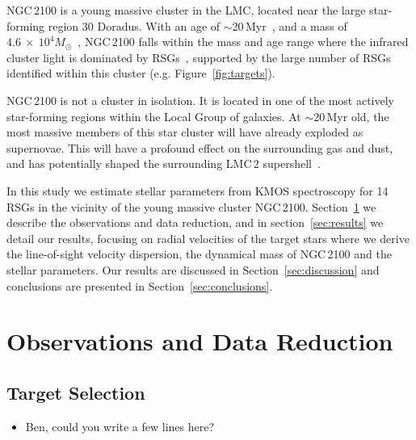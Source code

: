 \documentclass[useAMS,usenatbib]{mn2e}
\begin{document}

NGC\,2100 is a young massive cluster in the LMC, located near the large star-forming region 30 Doradus.
With an age of $\sim$20\,Myr~\citep{1991ApJS...76..185E,2015A&A...575A..62N}, and a mass of $4.6~\times~10^4M_{\odot}$~\citep[assuming~\cite{1966AJ.....71...64K} profiles]{2005ApJS..161..304M}, NGC\,2100 falls within the mass and age range where the infrared cluster light is dominated by RSGs~\citep{2013MNRAS.430L..35G},
supported by the large number of RSGs identified within this cluster (e.g. Figure~\ref{fig:targets}).

NGC\,2100 is not a cluster in isolation.
It is located in one of the most actively star-forming regions within the Local Group of galaxies.
At $\sim$20\,Myr old, the most massive members of this star cluster will have already exploded as supernovae.
This will have a profound effect on the surrounding gas and dust, and has potentially shaped the surrounding LMC\,2 supershell~\citep[see][]{1999ApJ...518..298P}.


In this study we estimate stellar parameters from KMOS spectroscopy for 14 RSGs in the vicinity of the young massive cluster NGC\,2100.
Section~\ref{sec:observations} we describe the observations and data reduction, and in section~\ref{sec:results} we detail our results, focusing on radial velocities of the target stars where we derive the line-of-sight velocity dispersion, the dynamical mass of NGC\,2100 and the stellar parameters.
Our results are discussed in Section~\ref{sec:discussion} and conclusions are presented in Section~\ref{sec:conclusions}.


\section{Observations and Data Reduction} %
\label{sec:observations}
\subsection{Target Selection} %
\label{sub:target_selection}

\begin{itemize}
  \item Ben, could you write a few lines here?
\end{itemize}
\end{document}
